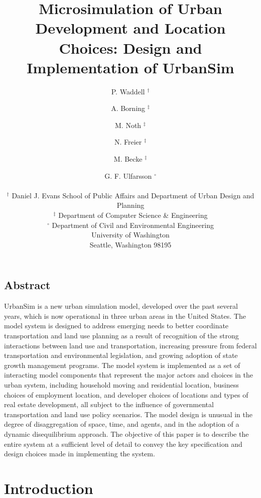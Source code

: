 \documentclass[fleqn]{article}
\begin{document}
\title{Microsimulation of Urban Development and Location Choices: Design and Implementation of UrbanSim}
\author{P. Waddell $^\dag$ \and A. Borning $^\ddag$ \and M. Noth $^\ddag$ \and N. Freier $^\ddag$ \and M. Becke
$^\ddag$ \and G. F. Ulfarsson $^\circ$
\\\\
$^\dag$ Daniel J. Evans School of Public Affairs and Department of Urban Design and Planning \\ $^\ddag$ Department of Computer Science \& Engineering \\ $^\circ$ Department of Civil and Environmental Engineering \\ University of Washington \\
Seattle, Washington 98195}
\date{}
\maketitle

\subsection*{Abstract}

UrbanSim is a new urban simulation model, developed over the past
several years, which is now operational in three urban areas in
the United States.  The model system is designed to address
emerging needs to better coordinate transportation and land use
planning as a result of recognition of the strong interactions
between land use and transportation, increasing pressure from
federal transportation and environmental legislation, and growing
adoption of state growth management programs. The model system is
implemented as a set of interacting model components that
represent the major actors and choices in the urban system,
including household moving and residential location, business
choices of employment location, and developer choices of locations
and types of real estate development, all subject to the influence
of governmental transportation and land use policy scenarios.  The
model design is unusual in the degree of disaggregation of space,
time, and agents, and in the adoption of a dynamic disequilibrium
approach. The objective of this paper is to describe the entire
system at a sufficient level of detail to convey the key
specification and design choices made in implementing the system.


\section{Introduction}
\end{document}

